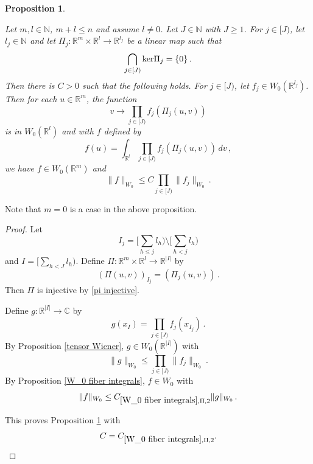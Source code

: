 \documentclass[12pt,reqno]{amsart}
\theoremstyle{plain}
\newtheorem{proposition}[theorem]{Proposition}
\numberwithin{equation}{section}
\theoremstyle{remark}
\newcommand{\uses}[1]{}
\newcommand{\usesdefs}[1]{}
\newcommand{\leanok}{}
\newcommand{\lean}[1]{}
\newcommand{\R}{{\mathbb R}}
\newcommand{\N}{{\mathbb N}}
\newcommand{\C}{{\mathbb C}}
\begin{document}
\begin{proposition}\label{W_0 Brascamp Lieb}\uses{tensor Wiener,W_0 fiber integrals}\usesdefs{auto:Wiener-space-definition}
\lean{Auto.exists_brascamp_lieb_memW0}
\leanok
 Let  $m,l\in\N$, $m+l\le n$ and assume $l\neq 0$.
Let $J\in \N$ with $J\ge 1$. For $j\in [J)$, let $l_j\in \N$ and let  $\Pi_j:\R^m\times \R^l \to \R^{l_j}$
be a linear map such that
\begin{equation}\label{pi injective}
    \bigcap_{j\in [J)} {\rm ker}\Pi_j=\{0\}\, .
\end{equation}
Then there is $C>0$ such that the following holds.
For $j\in [J)$, let $f_j\in W_0(\R^{l_j})$. Then for each
 $u\in \R^m$, the function
 \begin{equation}\label{auto:Wiener-Brascamp-Lieb-fiber-integrand}
     v\to \prod_{j\in [J)}f_j(\Pi_{j}(u,v))
 \end{equation}
 is in $W_0(\R^l)$ and with $f$ defined by
    \begin{equation}\label{auto:Wiener-Brascamp-Lieb-integral}
        f(u)=\int_{\R^l}\prod_{j\in [J)}f_j(\Pi_{j}(u,v))\, dv \, ,
    \end{equation}
    we have $f\in W_0(\R^{m})$ and
    \begin{equation}\label{auto:Wiener-Brascamp-Lieb-bound}
        \|f\|_{W_0}\le C\prod_{j\in[J)}\|f_j\|_{W_0}\, .
    \end{equation}
\end{proposition}
Note that $m=0$ is a case in the above proposition.
\begin{proof}
Let
\begin{equation}
    I_j=[\sum_{h\le j}l_h)\setminus [\sum_{h<j}l_h)
\end{equation}
and $I=[\sum_{h<J} l_h)$.
Define
$\Pi:\R^{m}\times \R^l\to \R^{|I|}$ by
\begin{equation}
    (\Pi(u,v))_{I_j}=(\Pi_{j}(u,v))\, .
\end{equation}
Then $\Pi$ is injective by \eqref{pi injective}.

Define $g:\R^{|I|}\to \C$ by
\begin{equation}
    g(x_I)=\prod_{j\in [J)}f_j(x_{I_j})\, .
\end{equation}
By Proposition \ref{tensor Wiener}, $g\in W_0(\R^{|I|})$ with
\begin{equation}
    \|g\|_{W_0}\le \prod_{j\in[J)}\|f_j\|_{W_0}\ .
\end{equation}
By Proposition \ref{W_0 fiber integrals}, $f\in W_0$ with
\begin{equation}
    \|f\|_{W_0}\le C_{\ref{W_0 fiber integrals},\Pi,2}\|g\|_{W_0}\, .
\end{equation}

This proves Proposition \ref{W_0 Brascamp Lieb} with
\[
C=C_{\ref{W_0 fiber integrals},\Pi,2}.
\]
\end{proof}
\end{document}
